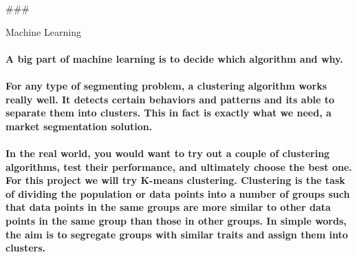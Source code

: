 \documentclass[11pt]{article}
\begin{document}
    \#\#\#

Machine Learning

    \paragraph{A big part of machine learning is to decide which algorithm
and
why.}\label{a-big-part-of-machine-learning-is-to-decide-which-algorithm-and-why.}

\paragraph{For any type of segmenting problem, a clustering algorithm
works really well. It detects certain behaviors and patterns and its
able to separate them into clusters. This in fact is exactly what we
need, a market segmentation
solution.}\label{for-any-type-of-segmenting-problem-a-clustering-algorithm-works-really-well.-it-detects-certain-behaviors-and-patterns-and-its-able-to-separate-them-into-clusters.-this-in-fact-is-exactly-what-we-need-a-market-segmentation-solution.}

\paragraph{In the real world, you would want to try out a couple of
clustering algorithms, test their performance, and ultimately choose the
best one. For this project we will try K-means clustering. Clustering is
the task of dividing the population or data points into a number of
groups such that data points in the same groups are more similar to
other data points in the same group than those in other groups. In
simple words, the aim is to segregate groups with similar traits and
assign them into
clusters.}\label{in-the-real-world-you-would-want-to-try-out-a-couple-of-clustering-algorithms-test-their-performance-and-ultimately-choose-the-best-one.-for-this-project-we-will-try-k-means-clustering.-clustering-is-the-task-of-dividing-the-population-or-data-points-into-a-number-of-groups-such-that-data-points-in-the-same-groups-are-more-similar-to-other-data-points-in-the-same-group-than-those-in-other-groups.-in-simple-words-the-aim-is-to-segregate-groups-with-similar-traits-and-assign-them-into-clusters.}
\end{document}
